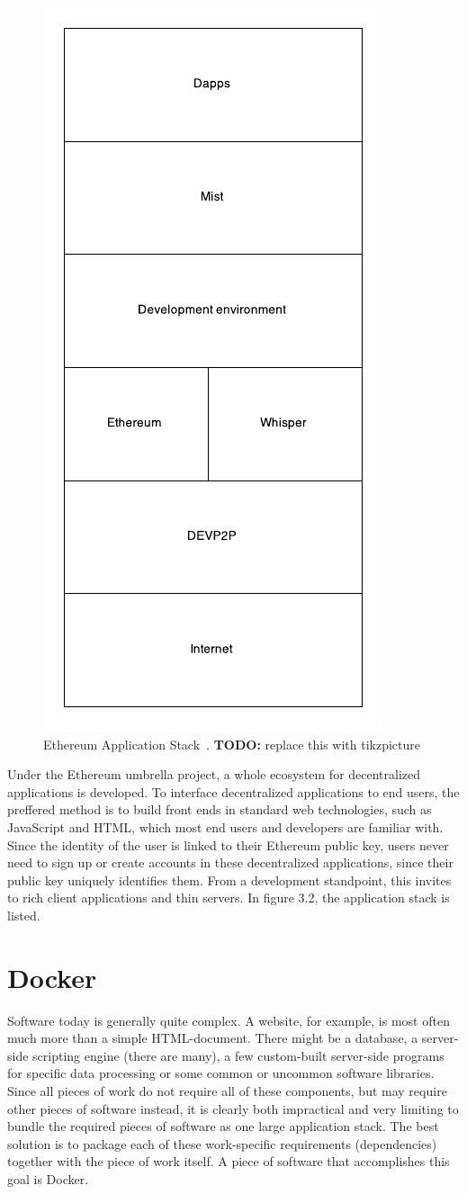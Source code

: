 \begin{figure}[ht]
\centering
\includegraphics[width=0.30\linewidth]{figure/ethereum-applicationstack.pdf}
\centering
\caption{Ethereum Application Stack~\cite{eth:applicationstack}.
\textbf{TODO:} replace this with tikzpicture}
\end{figure}

Under the Ethereum umbrella project, a whole ecosystem for decentralized applications is developed. To interface decentralized applications to end users, the preffered method is to build front ends in standard web technologies, such as JavaScript and HTML, which most end users and developers are familiar with. Since the identity of the user is linked to their Ethereum public key, users never need to sign up or create accounts in these decentralized applications, since their public key uniquely identifies them.
From a development standpoint, this invites to rich client applications and thin servers. In figure 3.2, the application stack is listed. 

\section{Docker}
Software today is generally quite complex. A website, for example, is most often much more than a simple HTML-document. There might be a database, a server-side scripting engine (there are many), a few custom-built server-side programs for specific data processing or some common or uncommon software libraries. Since all pieces of work do not require all of these components, but may require other pieces of software instead, it is clearly both impractical and very limiting to bundle the required pieces of software as one large application stack. The best solution is to package each of these work-specific requirements (dependencies) together with the piece of work itself. A piece of software that accomplishes this goal is Docker.

